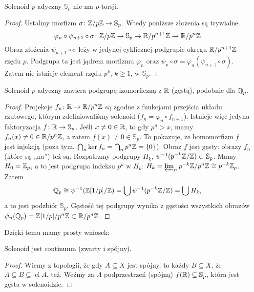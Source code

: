 \begin{fakt}
	Solenoid $p$-adyczny $\mathbb S_p$ nie ma $p$-torsji.
\end{fakt}

\begin{proof}
	Ustalmy morfizm $\sigma \colon \mathbb Z / p\mathbb Z \to \mathbb S_p$.
	Wtedy poniższe złożenia są trywialne.
	\[
		\varphi_n \circ \psi_{n+1} \circ \sigma \colon \mathbb Z/p\mathbb Z \to \mathbb S_p\to \mathbb R/p^{n+1}\mathbb Z \to \mathbb R/p^n\mathbb Z
	\]
	Obraz złożenia $\psi_{n+1} \circ \sigma$ leży w jedynej cyklicznej podgrupie okręgu $\mathbb R/p^{n+1} \mathbb Z$ rzędu $p$.
	Podgrupa ta jest jądrem morfizmu $\varphi_n$ oraz $\psi_n \circ \sigma = \varphi_n(\psi_{n+1} \circ \sigma)$.
	Zatem nie istnieje element rzędu $p^k$, $k \ge 1$, w $\mathbb S_p$.
\end{proof}

\begin{fakt}
	Solenoid $p$-adyczny zawiera podgrupę izomorficzną z $\mathbb R$ (gęstą), podobnie dla $\mathbb Q_p$.
\end{fakt}

\begin{proof}
	Projekcje $f_n \colon \mathbb R \to \mathbb R/p^n\mathbb Z$ są zgodne z funkcjami przejścia układu rzutowego, którym zdefiniowaliśmy solenoid ($f_n = \varphi_n \circ f_{n+1}$).
	Istnieje więc jedyna faktoryzacja $f \colon \mathbb R \to \mathbb S_p$.
	Jeśli $x \neq 0 \in \mathbb R$, to gdy $p^n > x$, mamy $f_n(x) \neq 0 \in \mathbb R/p^n\mathbb Z$, a zatem $f(x) \neq 0 \in \mathbb S_p$.
	To pokazuje, że homomorfizm $f$ jest injekcją (poza tym, $\bigcap_n \ker f_n = \bigcap_n p^n\mathbb Z = \{0\}$).
	Obraz $f$ jest gęsty: obrazy $f_n$ (które są ,,na'') też są.
	Rozpatrzmy podgrupy $H_k$, $\psi^{-1}(p^{-k} \mathbb Z/\mathbb Z) \subset \mathbb S_p$.
	Mamy $H_0 = \mathbb Z_p$, a to jest podgrupa indeksu $p^k$ w $H_k$: $H_k = \varprojlim_n p^{-k}\mathbb Z / p^n\mathbb Z \cong p^{-k}\mathbb Z_p$.
	Zatem
	\[
		\mathbb Q_p \cong \psi^{-1}(\mathbb Z[1/p] / \mathbb Z) = \bigcup \psi^{-1} (p^{-k}\mathbb Z/\mathbb Z) = \bigcup H_k,
	\]
	a to jest podzbiór $\mathbb S_p$.
	Gęstość tej podgrupy wynika z gęstości wszystkich obrazów
	$
		\psi_n (\mathbb Q_p) = \mathbb Z[1/p] / p^n \mathbb Z \subset \mathbb R/p^n\mathbb Z$.
\end{proof}

Dzięki temu mamy prosty wniosek:

\begin{fakt}
	Solenoid jest continuum (zwarty i spójny).
\end{fakt}

\begin{proof}
	Wiemy z topologii, że gdy $A \subseteq X$ jest spójny, to każdy $B \subseteq X$, że $A \subseteq B \subseteq \operatorname{cl} A$, też.
	Weźmy za $A$ podprzestrzeń (spójną) $f(\mathbb R) \subseteq \mathbb S_p$, która jest gęsta w solenoidzie.
\end{proof}

